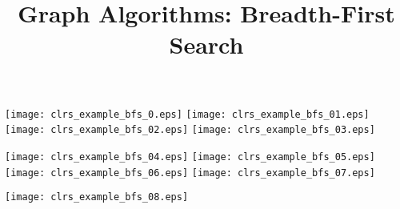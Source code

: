 \documentclass{article}
\title{Graph Algorithms: Breadth-First Search}
\begin{document}
\maketitle
{}\vspace{1em}


\vspace{1em}


\texttt{[image: clrs\_example\_bfs\_0.eps]}
\vspace{1em}
\texttt{[image: clrs\_example\_bfs\_01.eps]}
\vspace{1em}
\texttt{[image: clrs\_example\_bfs\_02.eps]}
\vspace{1em}
\texttt{[image: clrs\_example\_bfs\_03.eps]}
\vspace{1em}


\texttt{[image: clrs\_example\_bfs\_04.eps]}
\vspace{1em}
\texttt{[image: clrs\_example\_bfs\_05.eps]}
\vspace{1em}
\texttt{[image: clrs\_example\_bfs\_06.eps]}
\vspace{1em}
\texttt{[image: clrs\_example\_bfs\_07.eps]}
\vspace{1em}


\texttt{[image: clrs\_example\_bfs\_08.eps]}
\end{document}
